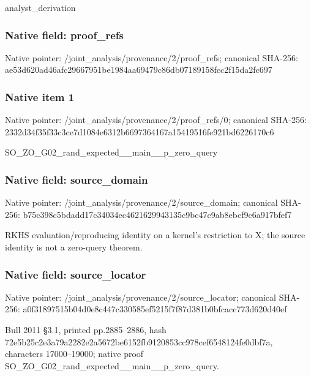 \documentclass[10pt,a4paper]{article}
\begin{document}
\begingroup\raggedright\sloppy analyst\_\allowbreak{}derivation\par\endgroup

\subsubsection{Native field: proof\_\allowbreak{}refs}
Native pointer: /joint\_\allowbreak{}analysis/provenance/2/proof\_\allowbreak{}refs; canonical SHA-256: ae53d620ad46afc29667951be1984aa69479c86db07189158fcc2f15da2fc697

\subsubsection{Native item 1}
Native pointer: /joint\_\allowbreak{}analysis/provenance/2/proof\_\allowbreak{}refs/0; canonical SHA-256: 2332d34f35f33c3ce7d1084e6312b6697364167a15419516fe921bd6226170c6

\begingroup\raggedright\sloppy SO\_\allowbreak{}ZO\_\allowbreak{}G02\_\allowbreak{}rand\_\allowbreak{}expected\_\allowbreak{}\_\allowbreak{}main\_\allowbreak{}\_\allowbreak{}p\_\allowbreak{}zero\_\allowbreak{}query\par\endgroup

\subsubsection{Native field: source\_\allowbreak{}domain}
Native pointer: /joint\_\allowbreak{}analysis/provenance/2/source\_\allowbreak{}domain; canonical SHA-256: b75c398c5bdadd17c34034ec4621629943135c9bc47c9ab8ebcf9c6a917bfef7

\begingroup\raggedright\sloppy RKHS evaluation/\allowbreak{}reproducing identity on a kernel's restriction to X;\allowbreak{} the source identity is not a zero-query theorem.\par\endgroup

\subsubsection{Native field: source\_\allowbreak{}locator}
Native pointer: /joint\_\allowbreak{}analysis/provenance/2/source\_\allowbreak{}locator; canonical SHA-256: a0f31897515b04d0e8c447c330585ef5215f7f87d381b0bfcacc773d620d40ef

\begingroup\raggedright\sloppy Bull 2011 {\AtlasUnicodeText §}\allowbreak{}3.1,\allowbreak{} printed pp.2885{\AtlasUnicodeText –}\allowbreak{}2886,\allowbreak{} hash 72e5b25c2e3a79a2282e2a5672be6152fb9120853cc978cef6548124fe0dbf7a,\allowbreak{} characters 17000{\AtlasUnicodeText –}\allowbreak{}19000;\allowbreak{} native proof SO\_\allowbreak{}ZO\_\allowbreak{}G02\_\allowbreak{}rand\_\allowbreak{}expected\_\allowbreak{}\_\allowbreak{}main\_\allowbreak{}\_\allowbreak{}p\_\allowbreak{}zero\_\allowbreak{}query.\par\endgroup
\end{document}
